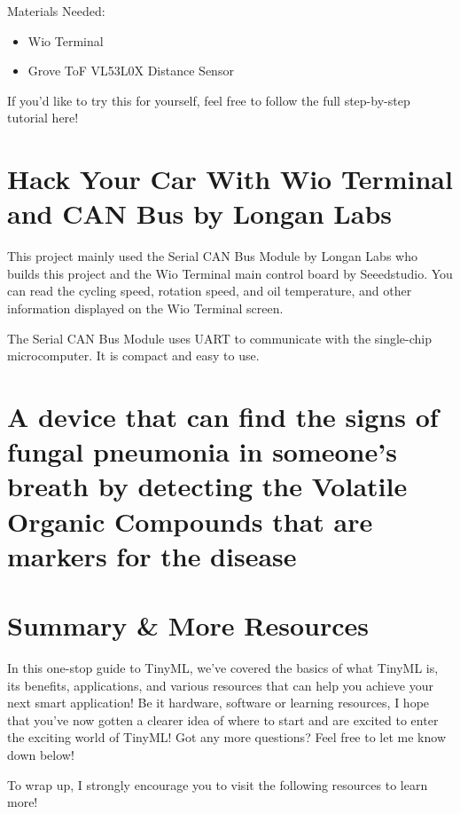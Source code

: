 \bigskip

Materials Needed:

\begin{itemize}
  \item Wio Terminal
  \item Grove ToF VL53L0X Distance Sensor
\end{itemize}

If you'd like to try this for yourself, feel free to follow the full step-by-step tutorial here!

\section{Hack Your Car With Wio Terminal and CAN Bus by Longan Labs}

This project mainly used the Serial CAN Bus Module by Longan Labs who builds this project and the Wio Terminal main control board by Seeedstudio. You can read the cycling speed, rotation speed, and oil temperature, and other information displayed on the Wio Terminal screen. 

The Serial CAN Bus Module uses UART to communicate with the single-chip microcomputer. It is compact and easy to use.

\section{A device that can find the signs of fungal pneumonia in someone’s breath by detecting the Volatile Organic Compounds that are markers for the disease}




\section{Summary \& More Resources}
In this one-stop guide to TinyML, we’ve covered the basics of what TinyML is, its benefits, applications, and various resources that can help you achieve your next smart application! Be it hardware, software or learning resources, I hope that you’ve now gotten a clearer idea of where to start and are excited to enter the exciting world of TinyML! Got any more questions? Feel free to let me know down below!

To wrap up, I strongly encourage you to visit the following resources to learn more!


